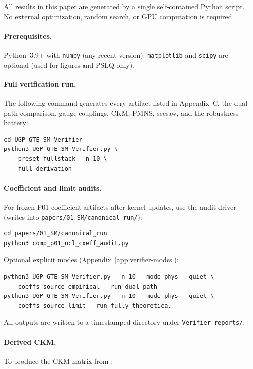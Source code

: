 \documentclass[11pt]{article}
\theoremstyle{remark}
\begin{document}
\begin{appendices}
All results in this paper are generated by a single self-contained Python script.
No external optimization, random search, or GPU computation is required.

\paragraph{Prerequisites.}
Python~3.9+ with \texttt{numpy} (any recent version). \texttt{matplotlib} and \texttt{scipy} are optional (used for figures and PSLQ only).

\paragraph{Full verification run.}
The following command generates every artifact listed in Appendix~C, the dual-path comparison, gauge couplings, CKM, PMNS, seesaw, and the robustness battery:

{\small
\begin{verbatim}
cd UGP_GTE_SM_Verifier
python3 UGP_GTE_SM_Verifier.py \
  --preset-fullstack --n 10 \
  --full-derivation
\end{verbatim}
}

\paragraph{Coefficient and limit audits.}
For frozen P01 coefficient artifacts after kernel updates, use the audit driver (writes into \texttt{papers/01\_SM/canonical\_run/}):

{\small
\begin{verbatim}
cd papers/01_SM/canonical_run
python3 comp_p01_ucl_coeff_audit.py
\end{verbatim}
}

Optional explicit modes (Appendix~\ref{app:verifier-modes}):

{\small
\begin{verbatim}
python3 UGP_GTE_SM_Verifier.py --n 10 --mode phys --quiet \
  --coeffs-source empirical --run-dual-path
python3 UGP_GTE_SM_Verifier.py --n 10 --mode phys --quiet \
  --coeffs-source limit --run-fully-theoretical
\end{verbatim}
}

All outputs are written to a timestamped directory under \texttt{Verifier\_reports/}.

\paragraph{Derived CKM.}
To produce the CKM matrix from :


\end{appendices}
\end{document}
